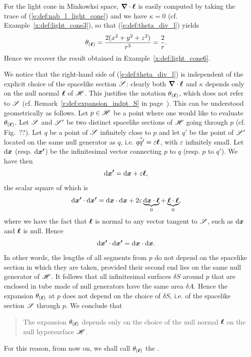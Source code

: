 {\begin{example}  \label{x:def:light_cone7}
For the light cone in Minkowksi space, $\bm{\nabla}\cdot\bm{\ell}$ is easily computed by taking the trace of
(\ref{e:def:nab_l_light_cone}) and we have $\kappa=0$ (cf. Example~\ref{x:def:light_cone3}),
so that (\ref{e:def:theta_div_l}) yields
\[
    \theta_{(\bm{\ell})} = \frac{2(x^2+y^2+z^2)}{r^3} = \frac{2}{r} .
\]
Hence we recover the result obtained in Example~\ref{x:def:light_cone6}.
\end{example}

We notice that the right-hand side of (\ref{e:def:theta_div_l}) is independent of the
explicit choice of the spacelike section $\mathscr{S}$: clearly both $\bm{\nabla}\cdot\bm{\ell}$
and $\kappa$ depends only on the null normal $\bm{\ell}$ of $\mathscr{H}$. This justifies
the notation $\theta_{(\bm{\ell})}$, which does not refer to $\mathscr{S}$
(cf. Remark~\ref{r:def:expansion_indpt_S} in page~\pageref{r:def:expansion_indpt_S}).
This can be understood geometrically as follows. Let $p\in\mathscr{H}$ be a
point where one would like to evaluate $\theta_{(\bm{\ell})}$. Let $\mathscr{S}$ and $\mathscr{S}'$
be two distinct spacelike sections of $\mathscr{H}$ going through $p$
(cf. Fig.~??). Let $q$ be a point of $\mathscr{S}$ infinitely close to $p$ and let $q'$
be the point of $\mathscr{S}'$ located on the same null generator as $q$,
i.e. $\vec{qq'} = \varepsilon \bm{\ell}$, with $\varepsilon$ infinitely small.
Let $\mathrm{d}\bm{x}$ (resp. $\mathrm{d}\bm{x'}$) be the infinitesimal vector connecting
$p$ to $q$ (resp. $p$ to $q'$). We have then
\[
\mathrm{d}\bm{x'} = \mathrm{d}\bm{x} + \varepsilon \bm{\ell} ,
\]
the scalar square of which is
\[
    \mathrm{d}\bm{x'}\cdot\mathrm{d}\bm{x'} =\mathrm{d}\bm{x}\cdot\mathrm{d}\bm{x}
            + 2 \varepsilon \underbrace{\mathrm{d}\bm{x}\cdot \bm{\ell}}_{0}
            + \underbrace{\bm{\ell}\cdot \bm{\ell}}_{0},
\]
where we have the fact that $\bm{\ell}$ is normal to any vector tangent to $\mathscr{S}$,
such as $\mathrm{d}\bm{x}$ and $\bm{\ell}$ is null. Hence
\[
    \mathrm{d}\bm{x'}\cdot\mathrm{d}\bm{x'} = \mathrm{d}\bm{x}\cdot\mathrm{d}\bm{x} .
\]
In other words, the lengths of all segments from $p$ do not depend
on the spacelike section in which they are taken, provided their second end
lies on the same null generator of $\mathscr{H}$. It follows that all infinitesimal surfaces
$\delta S$ around $p$ that are enclosed in tube made of null generators have the same
area $\delta A$. Hence the expansion $\theta_{(\bm{\ell})}$ at $p$
does not depend on the choice of $\delta S$, i.e. of the spacelike section
$\mathscr{S}$ through $p$.
We conclude that
\begin{quote}
The expansion $\theta_{(\bm{\ell})}$ depends only on the choice of the null
normal $\bm{\ell}$ on the null hypersurface $\mathscr{H}$.
\end{quote}
For this reason, from now on, we shall call $\theta_{(\bm{\ell})}$
the .

}
